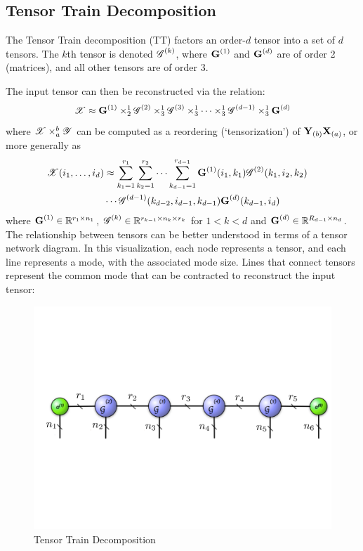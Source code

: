\subsection{Tensor Train Decomposition}
The Tensor Train decomposition (TT) factors an order-$d$ tensor into a set of $d$ tensors. The $k$th tensor is denoted $\T{G}^{(k)}$, where $\M{G}^{(1)}$ and $\M{G}^{(d)}$ are of order 2 (matrices), and all other tensors are of order 3. 

The input tensor can then be reconstructed via the relation:
\begin{equation}
\T{X} \approx \M{G}^{(1)} \times_{2}^1 \T{G}^{(2)} \times_{3}^1 \T{G}^{(3)} \times_3^1 \dots
\times_3^1 \T{G}^{(d-1)}\times_3^1 \M{G}^{(d)} 
\end{equation}
where $\T{X} \times_a^b \T{Y}$ can be computed as a reordering (`tensorization') of $\M{Y}_{(b)} \M{X}_{(a)}$, or more generally as 
\begin{align*}
\T{X}(i_1,\dots,i_d) & \approx  
\sum_{{k_1}=1}^{r_1} \sum_{{k_2}=1}^{r_2}\cdots\sum_{{k_{d-1}}=1}^{r_{d-1}} \M{G}^{(1)}(i_1,k_1)\T{G}^{(2)}(k_1,i_2,k_2) & \\ & \cdots\T{G}^{(d-1)}(k_{d-2},i_{d-1},k_{d-1})\M{G}^{(d)}(k_{d-1},i_d)
\end{align*}
where $\M{G}^{(1)}\in \R^{r_1\times n_1}$, $\T{G}^{(k)} \in \R^{r_{k-1}\times n_k \times r_k}$ for $1< k< d$ and $\M{G}^{(d)}\in \R^{R_{d-1}\times n_d}$. The relationship between tensors can be better understood in terms of a tensor network diagram. In this visualization, each node represents a tensor, and each line represents a mode, with the associated mode size. Lines that connect tensors represent the common mode that can be contracted to reconstruct the input tensor:
\begin{figure}[htbp]
    \center\includegraphics[width=0.80\linewidth]{thpropfigs/tensortrain}
    \caption{Tensor Train Decomposition}
\end{figure}
